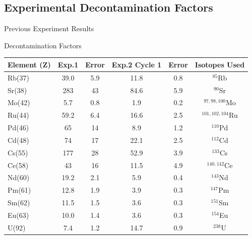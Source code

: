 \documentclass{beamer}
\begin{document}
\subsection{Experimental Decontamination Factors}
\begin{frame}{Previous Experiment Results}
  \vspace{-0.6cm}
  \begin{block}{Decontamination Factors}
    \begin{center}
      \vskip -0.2cm
  {\fontsize{7}{11.2}\selectfont
  \begin{tabular}{l  c  c c c c}\toprule
   Element (Z)  & Exp.1 & Error & Exp.2 Cycle 1 & Error & Isotopes Used\\ \midrule 
   Rb(37) & 39.0 & 5.9 & 11.8 & 0.8 & $^{85}$Rb \\
   Sr(38) & 283  & 43  & 84.6 & 5.9 & $^{90}$Sr \\
   Mo(42) & 5.7  & 0.8 & 1.9  & 0.2 & $^{97,98,100}$Mo \\
   Ru(44) & 59.2 & 6.4 & 16.6 & 2.5 & $^{101,102,104}$Ru \\
   Pd(46) & 65   & 14  & 8.9  & 1.2 & $^{110}$Pd \\
   Cd(48) & 74   & 17  & 22.1 & 2.5 & $^{112}$Cd \\
   Cs(55) & 177  & 28  & 52.9 & 3.9 & $^{133}$Cs \\
   Ce(58) & 43   & 16  & 11.5 & 4.9 & $^{140,142}$Ce \\
   Nd(60) & 19.2 & 2.1 & 5.9  & 0.4 & $^{143}$Nd \\
   Pm(61) & 12.8 & 1.9 & 3.9  & 0.3 & $^{147}$Pm \\
   Sm(62) & 11.5 & 1.5 & 3.6  & 0.3 & $^{151}$Sm \\
   Eu(63) & 10.0 & 1.4 & 3.6  & 0.3 & $^{154}$Eu \\
   U(92) & 7.4   & 1.2 & 14.7 & 0.9 & $^{238}$U \\ \bottomrule
  \end{tabular}
  }
  \end{center}
  \end{block}
\end{frame}
\end{document}
